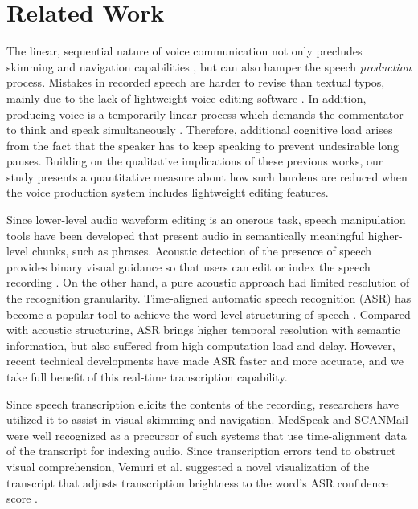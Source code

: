 \section{Related Work}

The linear, sequential nature of voice communication not only precludes skimming and navigation capabilities \cite{grudin}, but can also hamper the speech \emph{production} process. 
Mistakes in recorded speech are harder to revise than textual typos, mainly due to the lack of lightweight voice editing software \cite{marriott2002}. 
In addition, producing voice is a temporarily linear process which demands the commentator to think and speak simultaneously \cite{marriott2002, yoon:2015}. 
Therefore, additional cognitive load arises from the fact that the speaker has to keep speaking to prevent undesirable long pauses. 
Building on the qualitative implications of these previous works, our study presents a quantitative measure about how such burdens are reduced when the voice production system includes lightweight editing features.

Since lower-level audio waveform editing is an onerous task, speech manipulation tools have been developed that present audio in semantically meaningful higher-level chunks, such as phrases.
Acoustic detection of the presence of speech provides binary visual guidance so that users can edit or index the speech recording \cite{ades1986, hindus:1992}. 
On the other hand, a pure acoustic approach had limited resolution of the recognition granularity. 
Time-aligned automatic speech recognition (ASR) has become a popular tool to achieve the word-level structuring of speech \cite{Schmandt81, Wilcox:1992}. 
Compared with acoustic structuring, ASR brings higher temporal resolution with semantic information, but also suffered from high computation load and delay. 
However, recent technical developments have made ASR faster and more accurate, and we take full benefit of this real-time transcription capability.

Since speech transcription elicits the contents of the recording, researchers have utilized it to assist in visual skimming and navigation. 
MedSpeak \cite{Lai:1997} and SCANMail \cite{whittaker} were well recognized as a precursor of such systems that use time-alignment data of the transcript for indexing audio. 
Since transcription errors tend to obstruct visual comprehension, Vemuri et al. suggested a novel visualization of the transcript that adjusts transcription brightness to the word's ASR confidence score \cite{Vemuri:2004}. 

